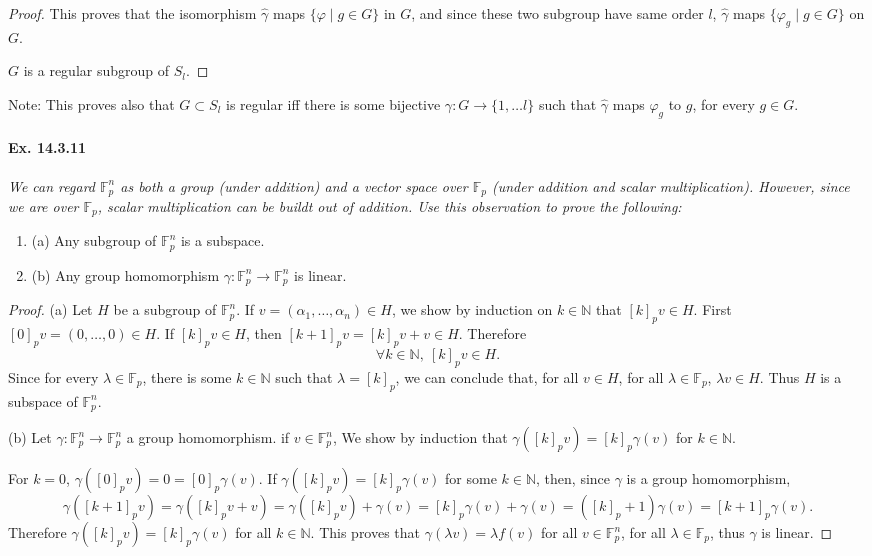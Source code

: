 \documentclass[11pt,a4paper]{article}
\newcommand{\be} {\begin{enumerate}}
\newcommand{\ee} {\end{enumerate}}
\newcommand{\N}{\mathbb{N}}
\newcommand{\F}{\mathbb{F}}
\begin{document}
\begin{proof}
This proves that the isomorphism $\hat \gamma$ maps $\{\varphi \mid g \in G\}$ in $G$, and since these two subgroup have same order $l$, $\hat \gamma$ maps $\{\varphi_g\mid g \in G\}$ on $G$.

$G$ is a regular subgroup of $S_l$.

  \end{proof}

Note: This proves also that $G \subset S_l$ is regular iff there is some bijective $\gamma : G \to \{1,\ldots l\}$ such that $\hat \gamma$ maps $\varphi_g$ to $g$, for every $g\in G$.

 \paragraph{Ex. 14.3.11}{\it We can regard $\F_p^n$ as both a group (under addition) and a vector space over $\F_p$ (under addition and scalar multiplication). However, since we are over $\F_p$, scalar multiplication can be buildt out of addition. Use this observation to prove the following:
 \be
 \item[(a)] Any subgroup of $\F_p^n$ is a subspace.
 \item[(b)] Any group homomorphism $\gamma : \F_p^n \to \F_p^n$ is linear.
 \ee
 }
 
 \begin{proof}
 \item[(a)] Let $H$ be a subgroup of $\F_p^n$.
If $v = (\alpha_1,\ldots,\alpha_n) \in H$, we show by induction on $k \in \N$ that $[k]_p v \in H$.
 First $[0]_p v = (0,\ldots,0) \in H$. If $[k]_p v \in H$, then $[k+1]_p v = [k]_pv + v \in H$. Therefore 
 $$\forall k \in \N,\ [k]_p v \in H.$$
 Since for every $\lambda \in \F_p$, there is some $k\in \N$ such that $\lambda =[k]_p$, we can conclude that, for all $v \in H$, for all $\lambda \in \F_p$, $\lambda v \in H$. Thus $H$ is a subspace of $\F_p^n$.
 
 \item[(b)] Let $\gamma : \F_p^n \to \F_p^n$ a group homomorphism. if $v \in \F_p^n$, We show by induction that $\gamma([k]_p v) = [k]_p \gamma(v)$ for $k \in \N$.
 
For $k = 0$, $ \gamma([0]_p v) = 0 =  [0]_p \gamma(v)$. If $\gamma([k]_p v) = [k]_p \gamma(v)$ for some $k\in \N$, then, since $\gamma$ is a group homomorphism,
$$\gamma([k+1]_p v) = \gamma([k]_p v + v) = \gamma([k]_pv) + \gamma(v) = [k]_p \gamma(v) + \gamma(v) = ([k]_p + 1)\gamma(v) = [k+1]_p \gamma(v).$$
Therefore $\gamma([k]_p v) = [k]_p \gamma(v)$  for all $k \in \N$. This proves that $\gamma(\lambda v) = \lambda f(v)$ for all $v \in \F_p^n$, for all $\lambda \in \F_p$, thus $\gamma$ is linear.
 
 \end{proof}
 
\end{document}
